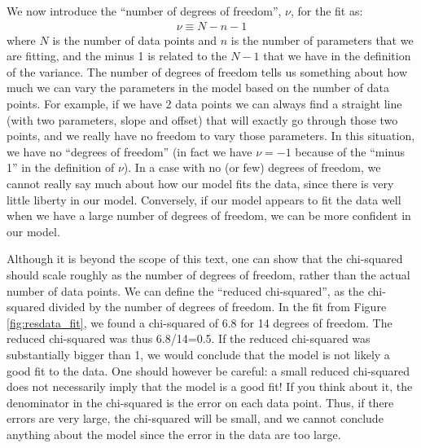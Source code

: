 We now introduce the ``number of degrees of freedom'', $\nu$, for the fit as:
\begin{align}
\nu\equiv N-n-1
\end{align}
where $N$ is the number of data points and $n$ is the number of parameters that we are fitting, and the minus 1 is related to the $N-1$ that we have in the definition of the variance. The number of degrees of freedom tells us something about how much we can vary the parameters in the model based on the number of data points. For example, if we have 2 data points we can always find a straight line (with two parameters, slope and offset) that will exactly go through those two points, and we really have no freedom to vary those parameters. In this situation, we have no ``degrees of freedom'' (in fact we have $\nu=-1$ because of the ``minus 1'' in the definition of $\nu$). In a case with no (or few) degrees of freedom, we cannot really say much about how our model fits the data, since there is very little liberty in our model. Conversely, if our model appears to fit the data well when we have a large number of degrees of freedom, we can be more confident in our model. 

Although it is beyond the scope of this text, one can show that the chi-squared should scale roughly as the number of degrees of freedom, rather than the actual number of data points. We can define the ``reduced chi-squared'', as the chi-squared divided by the number of degrees of freedom. In the fit from Figure \ref{fig:resdata_fit}, we found a chi-squared of 6.8 for 14 degrees of freedom. The reduced chi-squared was thus 6.8/14=0.5. If the reduced chi-squared was substantially bigger than 1, we would conclude that the model is not likely a good fit to the data. One should however be careful: a small reduced chi-squared does not necessarily imply that the model is a good fit! If you think about it, the denominator in the chi-squared is the error on each data point. Thus, if there errors are very large, the chi-squared will be small, and we cannot conclude anything about the model since the error in the data are too large.

